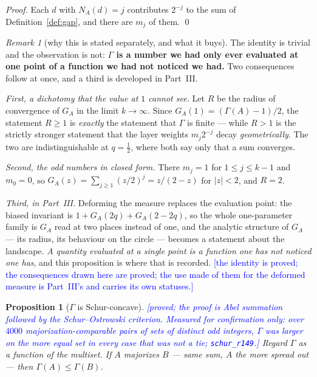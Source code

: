 \documentclass[11pt,a4paper]{article}
\theoremstyle{plain}
\newtheorem{proposition}[theorem]{Proposition}
\theoremstyle{definition}
\theoremstyle{remark}
\newtheorem{remark}[theorem]{Remark}
\newcommand{\STATUS}[1]{\textcolor{blue}{\textsf{[#1]}}}
\begin{document}
\begin{proof}
Each $d$ with $N_A(d)=j$ contributes $2^{-j}$ to the sum of
Definition~\ref{def:gap}, and there are $m_j$ of them. \qed
\end{proof}

\begin{remark}[why this is stated separately, and what it buys]\label{rem:gengamma}
The identity is trivial and the observation is not: \textbf{$\Gamma$ is a number we had only
ever evaluated at one point of a function we had not noticed we had.} Two consequences follow at
once, and a third is developed in Part~III.

\emph{First, a dichotomy that the value at $1$ cannot see.} Let $R$ be the radius of convergence
of $G_A$ in the limit $k\to\infty$. Since $G_A(1)=(\Gamma(A)-1)/2$, the statement $R\ge1$ is
\emph{exactly} the statement that $\Gamma$ is finite --- while $R>1$ is the strictly stronger
statement that the layer weights $m_j2^{-j}$ decay \emph{geometrically}. The two are
indistinguishable at $q=\tfrac12$, where both say only that a sum converges.

\emph{Second, the odd numbers in closed form.} There $m_j=1$ for $1\le j\le k-1$ and $m_0=0$, so
$G_A(z)=\sum_{j\ge1}(z/2)^{j}=z/(2-z)$ for $|z|<2$, and $R=2$.

\emph{Third, in Part~III.} Deforming the measure replaces the evaluation point: the biased
invariant is $1+G_A(2q)+G_A(2-2q)$, so the whole one-parameter family is $G_A$ read at two
places instead of one, and the analytic structure of $G_A$ --- its radius, its behaviour on the
circle --- becomes a statement about the landscape. \emph{A quantity evaluated at a single point
is a function one has not noticed one has}, and this proposition is where that is recorded.
\STATUS{the identity is proved; the consequences drawn here are proved; the use made of them for
the deformed measure is Part~III's and carries its own statuses.}
\end{remark}

\begin{proposition}[$\Gamma$ is Schur-concave]\label{prop:schur}
\STATUS{proved; the proof is Abel summation followed by the Schur--Ostrowski criterion.
Measured for confirmation only: over $4000$ majorization-comparable pairs of sets of distinct
odd integers, $\Gamma$ was larger on the more equal set in every case that was not a tie;
\texttt{schur\_r149}.}
Regard $\Gamma$ as a function of the multiset. If $A$ majorizes $B$ --- same sum, $A$ the more
spread out --- then $\Gamma(A)\le\Gamma(B)$.
\end{proposition}
\end{document}
